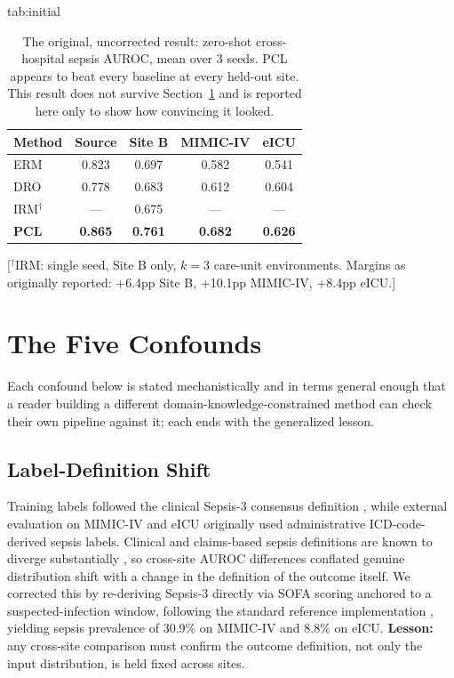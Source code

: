 \documentclass[pmlr,twocolumn,10pt]{jmlr} %
\begin{document}
\begin{table}[htbp]
\floatconts
  {tab:initial}%
  {\caption{The original, uncorrected result: zero-shot cross-hospital sepsis
   AUROC, mean over 3 seeds. PCL appears to beat every baseline at every
   held-out site. This result does not survive Section~\ref{sec:confounds}
   and is reported here only to show how convincing it looked.}}%
  {\begin{tabular}{lcccc}
  \toprule
  Method & Source & Site B & MIMIC-IV & eICU \\
  \midrule
  ERM & 0.823 & 0.697 & 0.582 & 0.541 \\
  DRO & 0.778 & 0.683 & 0.612 & 0.604 \\
  IRM$^\dagger$ & --- & 0.675 & --- & --- \\
  \textbf{PCL} & \textbf{0.865} & \textbf{0.761} & \textbf{0.682} & \textbf{0.626} \\
  \bottomrule
  \end{tabular}}
\end{table}
[$^\dagger$IRM: single seed, Site B only, $k{=}3$ care-unit environments.
Margins as originally reported: +6.4pp Site B, +10.1pp MIMIC-IV, +8.4pp eICU.]

\section{The Five Confounds}
\label{sec:confounds}

Each confound below is stated mechanistically and in terms general enough
that a reader building a different domain-knowledge-constrained method can
check their own pipeline against it; each ends with the generalized lesson.

\subsection{Label-Definition Shift}
Training labels followed the clinical Sepsis-3 consensus definition
\citep{singer2016sepsis3}, while external evaluation on MIMIC-IV and eICU
originally used administrative ICD-code-derived sepsis labels. Clinical and
claims-based sepsis definitions are known to diverge substantially
\citep{rhee2017incidence}, so cross-site AUROC differences conflated genuine
distribution shift with a change in the definition of the outcome itself.
We corrected this by re-deriving Sepsis-3 directly via SOFA scoring anchored
to a suspected-infection window, following the standard reference
implementation \citep{seymour2016assessment}, yielding sepsis prevalence of
30.9\% on MIMIC-IV and 8.8\% on eICU. \textbf{Lesson:} any cross-site
comparison must confirm the outcome definition, not only the input
distribution, is held fixed across sites.
\end{document}
